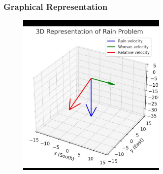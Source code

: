 \documentclass{beamer}
\theoremstyle{remark}
\begin{document}
\begin{frame}
\frametitle{Graphical Representation}

\begin{figure}[ht!]
    \centering
    \includegraphics[width=0.65\textwidth]{matgeo-1.2.27.jpeg}
    \caption{}
    \label{fig:1.2.27.jpg}
\end{figure}
\end{frame}
\end{document}
